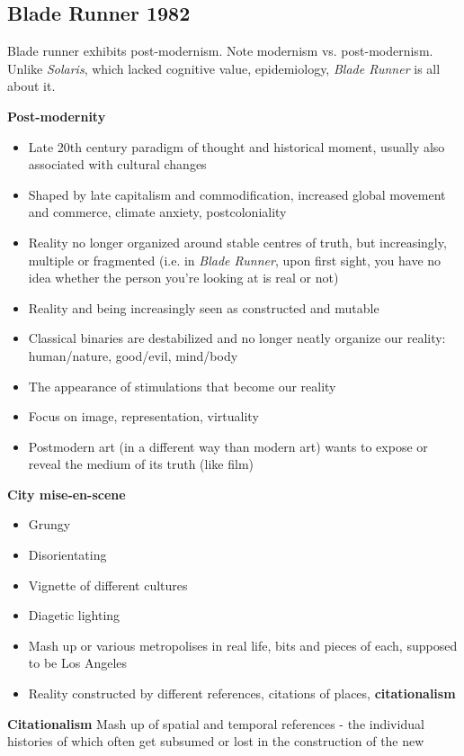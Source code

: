 \documentclass[11pt,fleqn]{book}
\begin{document}
\subsection{Blade Runner 1982}
\begin{remark}
    Blade runner exhibits post-modernism. Note modernism vs. post-modernism. Unlike \textit{Solaris}, which lacked cognitive value, epidemiology, \textit{Blade Runner} is all about it.
\end{remark}
\textbf{Post-modernity}
\begin{itemize}
    \item Late 20th century paradigm of thought and historical moment, usually also associated with cultural changes
    \item Shaped by late capitalism and commodification, increased global movement and commerce, climate anxiety, postcoloniality
    \item Reality no longer organized around stable centres of truth, but increasingly, multiple or fragmented (i.e. in \textit{Blade Runner}, upon first sight, you have no idea whether the person you're looking at is real or not)
    \item Reality and being increasingly seen as constructed and mutable
    \item Classical binaries are destabilized and no longer neatly organize our reality: human/nature, good/evil, mind/body
    \item The appearance of stimulations that become our reality
    \item Focus on image, representation, virtuality
    \item Postmodern art (in a different way than modern art) wants to expose or reveal the medium of its truth (like film)
\end{itemize}
\textbf{City mise-en-scene}
\begin{itemize}
    \item Grungy
    \item Disorientating
    \item Vignette of different cultures
    \item Diagetic lighting
    \item Mash up or various metropolises in real life, bits and pieces of each, supposed to be Los Angeles 
    \item Reality constructed by different references, citations of places, \textbf{citationalism}
\end{itemize}
\textbf{Citationalism} Mash up of spatial and temporal references - the individual histories of which often get subsumed or lost in the construction of the new\
\end{document}
